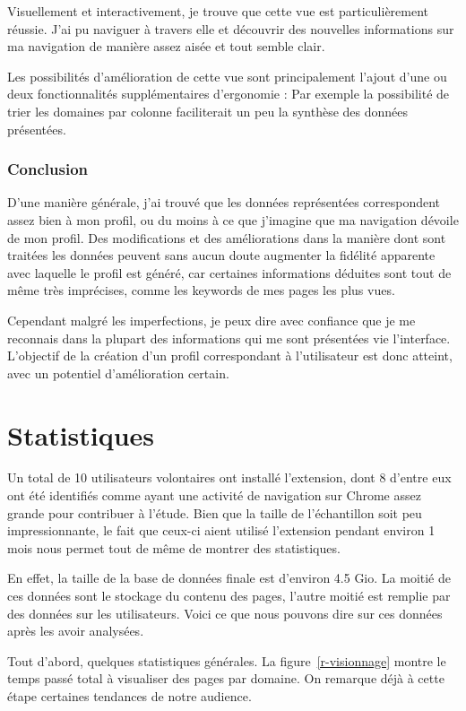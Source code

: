 		Visuellement et interactivement, je trouve que cette vue est particulièrement réussie. J'ai pu naviguer à travers elle et découvrir des nouvelles informations sur ma navigation de manière assez aisée et tout semble clair.

		Les possibilités d'amélioration de cette vue sont principalement l'ajout d'une ou deux fonctionnalités supplémentaires d'ergonomie : Par exemple la possibilité de trier les domaines par colonne faciliterait un peu la synthèse des données présentées.

		\subsubsection{Conclusion}

			D'une manière générale, j'ai trouvé que les données représentées correspondent assez bien à mon profil, ou du moins à ce que j'imagine que ma navigation dévoile de mon profil. Des modifications et des améliorations dans la manière dont sont traitées les données peuvent sans aucun doute augmenter la fidélité apparente avec laquelle le profil est généré, car certaines informations déduites sont tout de même très imprécises, comme les keywords de mes pages les plus vues.

			Cependant malgré les imperfections, je peux dire avec confiance que je me reconnais dans la plupart des informations qui me sont présentées vie l'interface. L'objectif de la création d'un profil correspondant à l'utilisateur est donc atteint, avec un potentiel d'amélioration certain.

\section{Statistiques}

	Un total de 10 utilisateurs volontaires ont installé l'extension, dont 8 d'entre eux ont été identifiés comme ayant une activité de navigation sur Chrome assez grande pour contribuer à l'étude. Bien que la taille de l'échantillon soit peu impressionnante, le fait que ceux-ci aient utilisé l'extension pendant environ 1 mois nous permet tout de même de montrer des statistiques.

	En effet, la taille de la base de données finale est d'environ 4.5 Gio. La moitié de ces données sont le stockage du contenu des pages, l'autre moitié est remplie par des données sur les utilisateurs. Voici ce que nous pouvons dire sur ces données après les avoir analysées.

	Tout d'abord, quelques statistiques générales. La figure~\ref{r-visionnage} montre le temps passé total à visualiser des pages par domaine. On remarque déjà à cette étape certaines tendances de notre audience.

